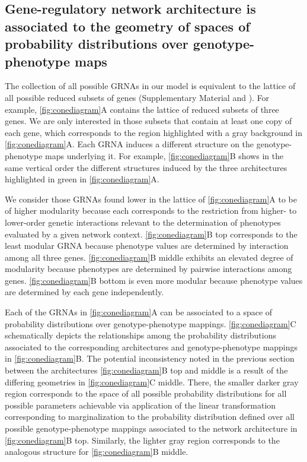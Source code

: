 \subsection{Gene-regulatory network architecture is associated to the geometry of spaces of probability distributions over genotype-phenotype maps}
The collection of all possible GRNAs in our model is equivalent to the lattice of all possible reduced subsets of genes (Supplementary Material and \cite{Lauritzen1996}). For example, \ref{fig:conediagram}A contains the lattice of reduced subsets of three genes. We are only interested in those subsets that contain at least one copy of each gene, which corresponds to the region highlighted with a gray background in \ref{fig:conediagram}A. Each GRNA induces a different structure on the genotype-phenotype maps underlying it. For example, \ref{fig:conediagram}B shows in the same vertical order the different structures induced by the three architectures highlighted in green in \ref{fig:conediagram}A.

We consider those GRNAs found lower in the lattice of \ref{fig:conediagram}A to be of higher modularity because each corresponds to the restriction from higher- to lower-order genetic interactions relevant to the determination of phenotypes evaluated by a given network context. \ref{fig:conediagram}B top corresponds to the least modular GRNA because phenotype values are determined by interaction among all three genes. \ref{fig:conediagram}B middle exhibits an elevated degree of modularity because phenotypes are determined by pairwise interactions among genes. \ref{fig:conediagram}B bottom is even more modular because phenotype values are determined by each gene independently.

Each of the GRNAs in \ref{fig:conediagram}A can be associated to a space of probability distributions over genotype-phenotype mappings. \ref{fig:conediagram}C schematically depicts the relationships among the probability distributions associated to the corresponding architectures and genotype-phenotype mappings in \ref{fig:conediagram}B. The potential inconsistency noted in the previous section between the architectures \ref{fig:conediagram}B top and middle is a result of the differing geometries in \ref{fig:conediagram}C middle. There, the smaller darker gray region corresponds to the space of all possible probability distributions for all possible parameters achievable via application of the linear transformation corresponding to marginalization to the probability distribution defined over all possible genotype-phenotype mappings associated to the network architecture in \ref{fig:conediagram}B top. Similarly, the lighter gray region corresponds to the analogous structure for \ref{fig:conediagram}B middle.

